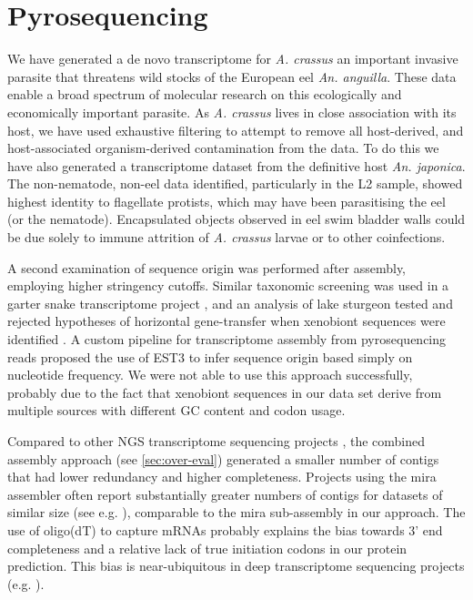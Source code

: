 \section{Pyrosequencing}
\label{sec:454-pyr}

We have generated a de novo transcriptome for \textit{A. crassus} an
important invasive parasite that threatens wild stocks of the European
eel \textit{An. anguilla}. These data enable a broad spectrum of
molecular research on this ecologically and economically important
parasite. As \textit{A. crassus} lives in close association with its
host, we have used exhaustive filtering to attempt to remove all
host-derived, and host-associated organism-derived contamination from
the data. To do this we have also generated a transcriptome dataset
from the definitive host \textit{An. japonica}. The non-nematode,
non-eel data identified, particularly in the L2 sample, showed highest
identity to flagellate protists, which may have been parasitising the
eel (or the nematode). Encapsulated objects observed in eel swim
bladder walls \cite{heitlinger_massive_2009} could be due solely to
immune attrition of \textit{A. crassus} larvae or to other
coinfections.

A second examination of sequence origin was performed after assembly,
employing higher stringency cutoffs. Similar taxonomic screening was
used in a garter snake transcriptome project \cite{pmid21138572}, and
an analysis of lake sturgeon tested and rejected hypotheses of
horizontal gene-transfer when xenobiont sequences were identified
\cite{pmid20386959}. A custom pipeline for transcriptome assembly from
pyrosequencing reads \cite{pmid20034392} proposed the use of EST3
\cite{pmid17218127} to infer sequence origin based simply on
nucleotide frequency. We were not able to use this approach
successfully, probably due to the fact that xenobiont sequences in our
data set derive from multiple sources with different GC content and
codon usage.

Compared to other NGS transcriptome sequencing projects
\cite{pmid20478048}, the combined assembly approach (see
\ref{sec:over-eval}) generated a smaller number of contigs that had
lower redundancy and higher completeness. Projects using the mira
assembler often report substantially greater numbers of contigs for
datasets of similar size (see e.g. \cite{pmid21364769}), comparable to
the mira sub-assembly in our approach. The use of oligo(dT) to capture
mRNAs probably explains the bias towards 3' end completeness and a
relative lack of true initiation codons in our protein
prediction. This bias is near-ubiquitous in deep transcriptome
sequencing projects (e.g. \cite{pmid20331785}).

